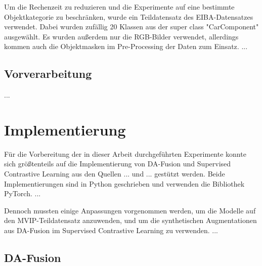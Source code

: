 Um die Rechenzeit zu reduzieren und die Experimente auf eine bestimmte Objektkategorie zu beschränken, wurde ein Teildatensatz des EIBA-Datensatzes verwendet. Dabei wurden zufällig 20 Klassen aus der super class "CarComponent" ausgewählt. Es wurden außerdem nur die RGB-Bilder verwendet, allerdings kommen auch die Objektmasken im Pre-Processing der Daten zum Einsatz. ...


\subsection{Vorverarbeitung} \label{sec:preprocessing}

...

\section{Implementierung} \label{sec:implementation}


Für die Vorbereitung der in dieser Arbeit durchgeführten Experimente konnte sich größtenteils auf die Implementierung von DA-Fusion und Supervised Contrastive Learning aus den Quellen ... und ... gestützt werden. Beide Implementierungen sind in Python geschrieben und verwenden die Bibliothek PyTorch. ...

Dennoch mussten einige Anpassungen vorgenommen werden, um die Modelle auf den MVIP-Teildatensatz anzuwenden, und um die synthetischen Augmentationen aus DA-Fusion im Supervised Contrastive Learning zu verwenden. ...

\subsection{DA-Fusion} \label{sec:impl-da-fusion}


